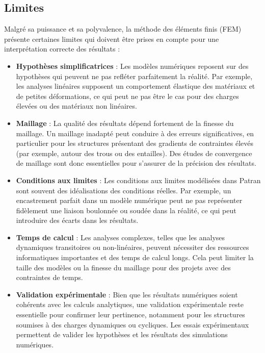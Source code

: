 \subsection{Limites}

Malgré sa puissance et sa polyvalence, la méthode des éléments finis (\acrshort{FEM}) 
présente certaines limites qui doivent être prises en compte pour une interprétation 
correcte des résultats :

\begin{itemize}
    \item \textbf{Hypothèses simplificatrices} :
    Les modèles numériques reposent sur des hypothèses qui peuvent ne pas refléter 
    parfaitement la réalité. Par exemple, les analyses linéaires supposent un 
    comportement élastique des matériaux et de petites déformations, ce qui peut ne pas 
    être le cas pour des charges élevées ou des matériaux non linéaires.

    \item \textbf{Maillage} :
    La qualité des résultats dépend fortement de la finesse du maillage. Un maillage 
    inadapté peut conduire à des erreurs significatives, en particulier pour les 
    structures présentant des gradients de contraintes élevés (par exemple, autour des 
    trous ou des entailles). Des études de convergence de maillage sont donc essentielles
     pour s'assurer de la précision des résultats.

    \item \textbf{Conditions aux limites} :
    Les conditions aux limites modélisées dans Patran sont souvent des idéalisations 
    des conditions réelles. Par exemple, un encastrement parfait dans un modèle 
    numérique peut ne pas représenter fidèlement une liaison boulonnée ou soudée dans 
    la réalité, ce qui peut introduire des écarts dans les résultats.

    \item \textbf{Temps de calcul} :
    Les analyses complexes, telles que les analyses dynamiques transitoires ou 
    non-linéaires, peuvent nécessiter des ressources informatiques importantes et 
    des temps de calcul longs. Cela peut limiter la taille des modèles ou la finesse 
    du maillage pour des projets avec des contraintes de temps.

    \item \textbf{Validation expérimentale} :
    Bien que les résultats numériques soient cohérents avec les calculs analytiques,
    une validation expérimentale reste essentielle pour confirmer leur pertinence, 
    notamment pour les structures soumises à des charges dynamiques ou cycliques. Les 
    essais expérimentaux permettent de valider les hypothèses et les résultats des 
    simulations numériques.
\end{itemize}

